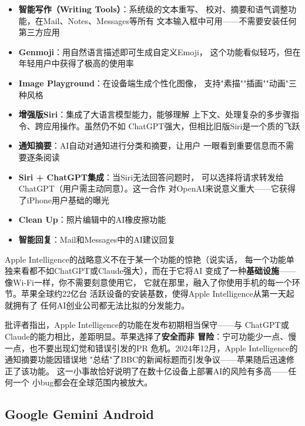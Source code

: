 \begin{itemize}
  \item \textbf{智能写作（Writing Tools）}：系统级的文本重写、
    校对、摘要和语气调整功能，在Mail、Notes、Messages等所有
    文本输入框中可用——不需要安装任何第三方应用
  \item \textbf{Genmoji}：用自然语言描述即可生成自定义Emoji，
    这个功能看似轻巧，但在年轻用户中获得了极高的使用率
  \item \textbf{Image Playground}：在设备端生成个性化图像，
    支持"素描""插画""动画"三种风格
  \item \textbf{增强版Siri}：集成了大语言模型能力，能够理解
    上下文、处理复杂的多步骤指令、跨应用操作。虽然仍不如
    ChatGPT强大，但相比旧版Siri是一个质的飞跃
  \item \textbf{通知摘要}：AI自动对通知进行分类和摘要，让用户
    一眼看到重要信息而不需要逐条阅读
  \item \textbf{Siri + ChatGPT集成}：当Siri无法回答问题时，
    可以选择将请求转发给ChatGPT（用户需主动同意）。这一合作
    对OpenAI来说意义重大——它获得了iPhone用户基础的曝光
  \item \textbf{Clean Up}：照片编辑中的AI橡皮擦功能
  \item \textbf{智能回复}：Mail和Messages中的AI建议回复
\end{itemize}

Apple Intelligence的战略意义不在于某一个功能的惊艳（说实话，
每一个功能单独来看都不如ChatGPT或Claude强大），而在于它将AI
变成了一种\textbf{基础设施}——像Wi-Fi一样，你不需要刻意使用它，
它就在那里，融入了你使用手机的每一个环节。苹果全球约22亿台
活跃设备的安装基数，使得Apple Intelligence从第一天起就拥有了
任何AI创业公司都无法比拟的分发能力。

批评者指出，Apple Intelligence的功能在发布初期相当保守——与
ChatGPT或Claude的能力相比，差距明显。苹果选择了\textbf{安全而非
冒险}：宁可功能少一点、慢一点，也不要出现幻觉和错误引发的PR
危机。2024年12月，Apple Intelligence的通知摘要功能因错误地
"总结"了BBC的新闻标题而引发争议——苹果随后迅速修正了该功能。
这一小事故恰好说明了在数十亿设备上部署AI的风险有多高——任何一个
小bug都会在全球范围内被放大。

\subsection{Google Gemini Android}
\label{subsec:gemini-android}

